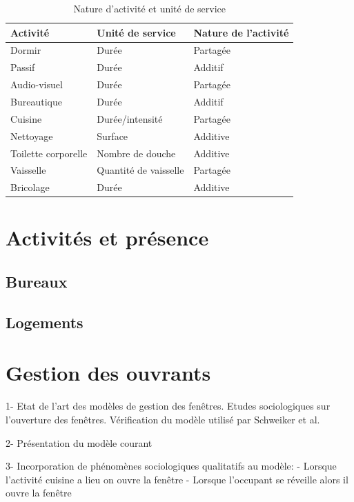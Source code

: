 \begin{table} [H]
\centering
\begin{tabular}{|l|l|l|}
\hline
Activité & Unité de service & Nature de l'activité \\
\hline
Dormir & Durée & Partagée \\
Passif & Durée & Additif \\
Audio-visuel & Durée & Partagée \\
Bureautique & Durée & Additif \\
Cuisine & Durée/intensité & Partagée \\
Nettoyage & Surface & Additive \\
Toilette corporelle & Nombre de douche & Additive \\
Vaisselle & Quantité de vaisselle & Partagée \\
Bricolage & Durée & Additive \\
\hline
\end{tabular}
\normalsize
\caption{Nature d'activité et unité de service}
\label{tab:activité et unité de service}
\end{table}

\section{Activités et présence}

\subsection{Bureaux}

\subsection{Logements}

\section{Gestion des ouvrants}

1- Etat de l'art des modèles de gestion des fenêtres. Etudes sociologiques sur l'ouverture des fenêtres. Vérification du modèle utilisé par Schweiker et al. \cite{Scweiker-12}

2- Présentation du modèle courant 

3- Incorporation de phénomènes sociologiques qualitatifs au modèle:
    - Lorsque l'activité cuisine a lieu on ouvre la fenêtre
    - Lorsque l'occupant se réveille alors il ouvre la fenêtre
    
